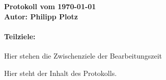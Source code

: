 \documentclass[a4paper,10pt]{article}
\begin{document}
{\bfseries \large Protokoll vom \today \\[1mm]		%
\normalfont Autor: Philipp Plotz}					%

\paragraph{Teilziele:}								%
Hier stehen die Zwischenziele der Bearbeitungszeit


Hier steht der Inhalt des Protokolls.
\end{document}
